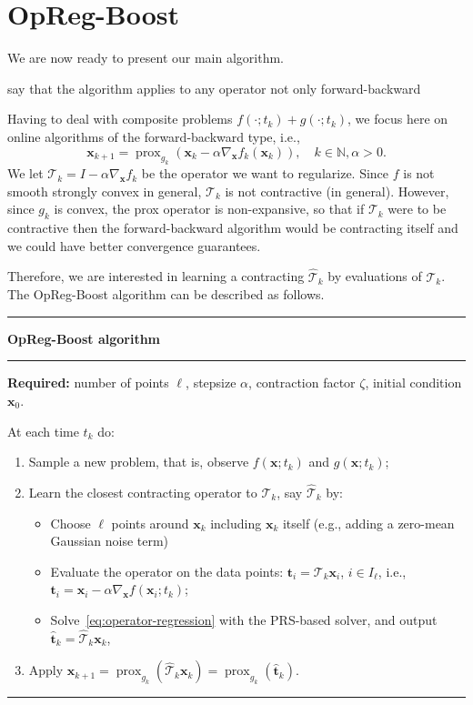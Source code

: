 \documentclass{article}
\DeclareMathOperator{\prox}{prox}
\newcommand{\N}{\mathbb{N}}
\newcommand{\tv}{\mathbold{t}}
\newcommand{\x}{\mathbold{x}}
\newcommand{\T}{\mathcal{T}}
\newcommand{\nicola}[1]{{\color{blue}#1}}
\begin{document}
\section{OpReg-Boost}\label{sec:online-opreg}

We are now ready to present our main algorithm.

\nicola{say that the algorithm applies to any operator not only forward-backward}

Having to deal with composite problems $f(\cdot; t_k) + g(\cdot; t_k)$, we focus here on online algorithms of the forward-backward type, i.e., 
\begin{equation}
\x_{k+1} = \prox_{g_k} (\x_k - \alpha \nabla_{\x} f_k(\x_k)), \quad k \in \N, \alpha >0.
\end{equation}
We let $\T_k = I - \alpha \nabla_{\x} f_k$ be the operator we want to regularize. Since $f$ is not smooth strongly convex in general, $\T_k$ is not contractive (in general). However, since $g_k$ is convex, the prox operator is non-expansive, so that if $\T_k$ were to be contractive then the forward-backward algorithm would be contracting itself and we could have better convergence guarantees. 

Therefore, we are interested in learning a contracting $\hat{\T}_k$ by evaluations of $\T_k$. The OpReg-Boost algorithm can be described as follows. 

\smallskip
\smallskip
\hrule
{\bf OpReg-Boost algorithm}
\smallskip
\hrule
{\bf Required:} number of points $\ell$, stepsize $\alpha$, contraction factor $\zeta$, initial condition $\x_0$.

At each time $t_k$ do:
\begin{enumerate}
	\item Sample a new problem, that is, observe $f(\x; t_k)$ and $g(\x; t_k)$;
	\item Learn the closest contracting operator to $\T_{k}$, say $\hat{\T}_k$ by:
	\begin{itemize}
		\item Choose $\ell$ points around $\x_k$ including $\x_k$ itself (e.g., adding a zero-mean Gaussian noise term)
		\item Evaluate the operator on the data points: $\tv_i = \T_{k} \x_i$, $i\in I_{\ell}$, i.e., $\tv_i = \x_i - \alpha \nabla_{\x} f(\x_i; t_k)$;
		\item Solve~\eqref{eq:operator-regression} with the PRS-based solver, and output $\hat{\tv}_k = \hat{\T}_k \x_k$,
\end{itemize}
	\item Apply $\x_{k+1} = \prox_{g_k} (\hat{\T}_k \x_k) = \prox_{g_k} (\hat{\tv}_k) $.
\end{enumerate}
\smallskip
\hrule
\end{document}
